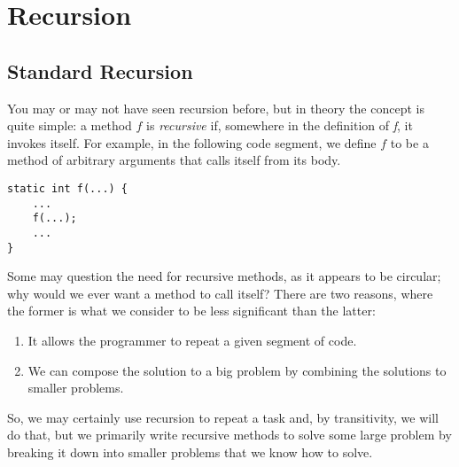 \section{Recursion}

\subsection*{Standard Recursion}
You may or may not have seen recursion before, but in theory the concept is quite simple: a method $f$ is \textit{recursive} if, somewhere in the definition of \textit{f}, it invokes itself. For example, in the following code segment, we define $f$ to be a method of arbitrary arguments that calls itself from its body. 
\begin{verbatim}
static int f(...) {
    ...
    f(...);
    ...
}
\end{verbatim}
Some may question the need for recursive methods, as it appears to be circular; why would we ever want a method to call itself? There are two reasons, where the former is what we consider to be less significant than the latter:
\begin{enumerate}
    \item It allows the programmer to repeat a given segment of code.
    \item We can compose the solution to a big problem by combining the solutions to smaller problems.
\end{enumerate}
So, we may certainly use recursion to repeat a task and, by transitivity, we will do that, but we primarily write recursive methods to solve some large problem by breaking it down into smaller problems that we know how to solve.

